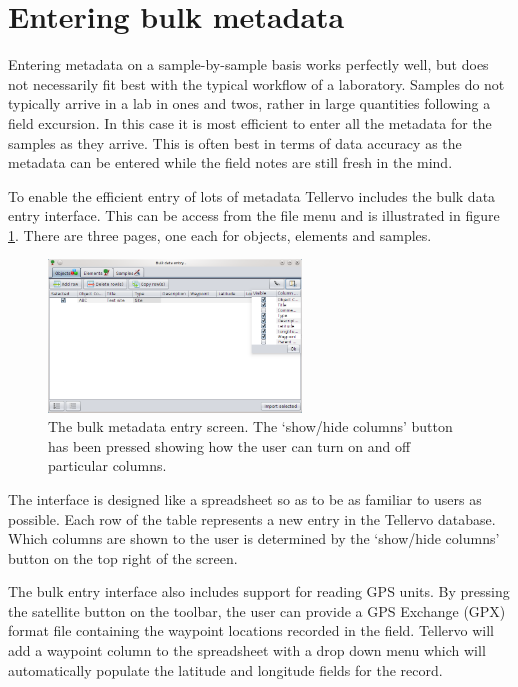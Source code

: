 

\section{Entering bulk metadata}
\label{txt:bulkentry}
Entering metadata on a sample-by-sample basis works perfectly well, but does not necessarily fit best with the typical workflow of a laboratory.  Samples do not typically arrive in a lab in ones and twos, rather in large quantities following a field excursion.  In this case it is most efficient to enter all the metadata for the samples as they arrive.  This is often best in terms of data accuracy as the metadata can be entered while the field notes are still fresh in the mind.

To enable the efficient entry of lots of metadata Tellervo includes the bulk data entry interface.  This can be access from the file menu and is illustrated in figure \ref{fig:bulkentry}.  There are three pages, one each for objects, elements and samples.

\begin{figure}
\centering
\includegraphics[width=0.6\textwidth]{Images/bulkentry.png}
\caption{The bulk metadata entry screen.  The `show/hide columns' button has been pressed showing how the user can turn on and off particular columns.} 
\label{fig:bulkentry}
\end{figure}

The interface is designed like a spreadsheet so as to be as familiar to users as possible.  Each row of the table represents a new entry in the Tellervo database.  Which columns are shown to the user is determined by the `show/hide columns' button on the top right of the screen.  

The bulk entry interface also includes support for reading GPS units.  By pressing the satellite button on the toolbar, the user can provide a GPS Exchange (GPX) format file containing the waypoint locations recorded in the field.   Tellervo will add a waypoint column to the spreadsheet with a drop down menu which will automatically populate the latitude and longitude fields for the record. 

